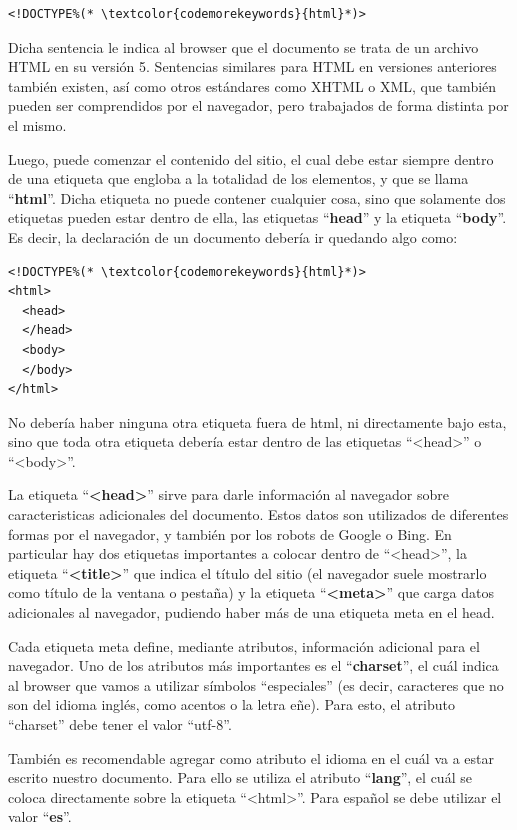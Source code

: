 \begin{lstlisting}[language=XHTML]
<!DOCTYPE%(* \textcolor{codemorekeywords}{html}*)>
\end{lstlisting}

Dicha sentencia le indica al browser que el documento se trata de un archivo
HTML en su versión 5. Sentencias similares para HTML en versiones anteriores
también existen, así como otros estándares como XHTML o XML, que también pueden
ser comprendidos por el navegador, pero trabajados de forma distinta por el mismo.

Luego, puede comenzar el contenido del sitio, el cual debe estar siempre dentro
de una etiqueta que engloba a la totalidad de los elementos, y que se llama
``\textbf{html}''. Dicha etiqueta no puede contener cualquier cosa, sino que
solamente dos etiquetas pueden estar dentro de ella, las etiquetas ``\textbf{head}''
y la etiqueta ``\textbf{body}''. Es decir, la declaración de un documento
debería ir quedando algo como:

\begin{lstlisting}[language=XHTML]
<!DOCTYPE%(* \textcolor{codemorekeywords}{html}*)>
<html>
  <head>
  </head>
  <body>
  </body>
</html>
\end{lstlisting}

No debería haber ninguna otra etiqueta fuera de html, ni directamente bajo
esta, sino que toda otra etiqueta debería estar dentro de las etiquetas ``<head>''
o ``<body>''.

La etiqueta ``\textbf{<head>}'' sirve para darle información al navegador sobre caracteristicas
adicionales del documento.  Estos datos son utilizados de diferentes formas por
el navegador, y también por los robots de Google o Bing. En particular hay dos
etiquetas importantes a colocar dentro de ``<head>'', la etiqueta ``\textbf{<title>}''
que indica el título del sitio (el navegador suele mostrarlo como título de la
ventana o pestaña) y la etiqueta ``\textbf{<meta>}'' que carga datos adicionales
al navegador, pudiendo haber más de una etiqueta meta en el head.

Cada etiqueta meta define, mediante atributos, información adicional para el
navegador. Uno de los atributos más importantes es el ``\textbf{charset}'', el
cuál indica al browser que vamos a utilizar símbolos ``especiales'' (es decir,
caracteres que no son del idioma inglés, como acentos o la letra eñe). Para esto,
el atributo ``charset'' debe tener el valor ``utf-8''.

También es recomendable agregar como atributo el idioma en el cuál va a estar
escrito nuestro documento. Para ello se utiliza el atributo ``\textbf{lang}'',
el cuál se coloca directamente sobre la etiqueta ``<html>''. Para español se
debe utilizar el valor ``\textbf{es}''.

